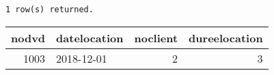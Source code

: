 \documentclass[11pt]{article}
\begin{document}
    \begin{Verbatim}[commandchars=\\\{\},fontsize=\footnotesize]
1 row(s) returned.

    \end{Verbatim}

    \begin{tabular}{rlrr}
\toprule
   nodvd & datelocation   &   noclient &   dureelocation \\
\midrule
    1003 & 2018-12-01     &          2 &               3 \\
\bottomrule
\end{tabular}

    

    
    
    
    
\end{document}

